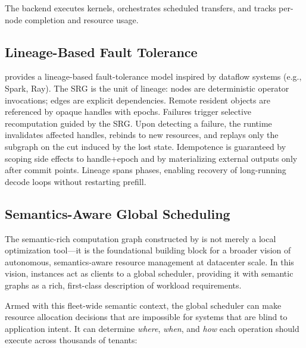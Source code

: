 The backend executes kernels, orchestrates scheduled tran\-sfers, and tracks per-node completion and resource usage.

\subsection{Lineage-Based Fault Tolerance}
\sys provides a lineage-based fault-tolerance model inspired by dataflow systems (e.g., Spark, Ray).
The SRG is the unit of lineage: nodes are deterministic operator invocations; edges are explicit dependencies.
Remote resident objects are referenced by opaque handles with epochs.
Failures trigger selective recomputation guided by the SRG.
Upon detecting a failure, the runtime invalidates affected handles, rebinds to new resources, and replays only the subgraph on the cut induced by the lost state.
Idempotence is guaranteed by scoping side effects to handle+epoch and by materializing external outputs only after commit points.
Lineage spans phases, enabling recovery of long-running decode loops without restarting prefill. 

\subsection{Semantics-Aware Global Scheduling}
\label{ssec:global_scheduling}

The semantic-rich computation graph constructed by \sys is not merely a local optimization tool---it is the foundational building block for a broader vision of autonomous, semantics-aware resource management at datacenter scale. In this vision, \sys instances act as clients to a global scheduler, providing it with semantic graphs as a rich, first-class description of workload requirements.

Armed with this fleet-wide semantic context, the global scheduler can make resource allocation decisions that are impossible for systems that are blind to application intent. It can determine \textit{where}, \textit{when}, and \textit{how} each operation should execute across thousands of tenants:

